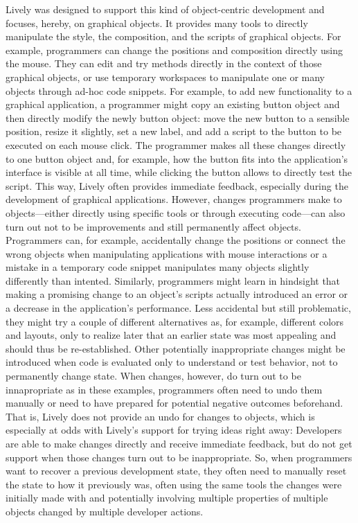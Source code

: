 Lively was designed to support this kind of object-centric development and focuses, hereby, on graphical objects.
It provides many tools to directly manipulate the style, the composition, and the scripts of graphical objects.
For example, programmers can change the positions and composition directly using the mouse.
They can edit and try methods directly in the context of those graphical objects, or use temporary workspaces to manipulate one or many objects through ad-hoc code snippets.
For example, to add new functionality to a graphical application, a programmer might copy an existing button object and then directly modify the newly button object: move the new button to a sensible position, resize it slightly, set a new label, and add a script to the button to be executed on each mouse click.
The programmer makes all these changes directly to one button object and, for example, how the button fits into the application's interface is visible at all time, while clicking the button allows to directly test the script.
This way, Lively often provides immediate feedback, especially during the development of graphical applications.
However, changes programmers make to objects---either directly using specific tools or through executing code---can also turn out not to be improvements and still permanently affect objects.
Programmers can, for example, accidentally change the positions or connect the wrong objects when manipulating applications with mouse interactions or a mistake in a temporary code snippet manipulates many objects slightly differently than intented.
Similarly, programmers might learn in hindsight that making a promising change to an object's scripts actually introduced an error or a decrease in the application's performance.
Less accidental but still problematic, they might try a couple of different alternatives as, for example, different colors and layouts, only to realize later that an earlier state was most appealing and should thus be re-established.
Other potentially inappropriate changes might be introduced when code is evaluated only to understand or test behavior, not to permanently change state.
When changes, however, do turn out to be innapropriate as in these examples, programmers often need to undo them manually or need to have prepared for potential negative outcomes beforehand.
That is, Lively does not provide an undo for changes to objects, which is especially at odds with Lively's support for trying ideas right away: Developers are able to make changes directly and receive immediate feedback, but do not get support when those changes turn out to be inappropriate.
So, when programmers want to recover a previous development state, they often need to manually reset the state to how it previously was, often using the same tools the changes were initially made with and potentially involving multiple properties of multiple objects changed by multiple developer actions.

